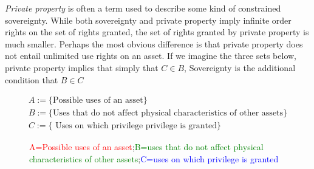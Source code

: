\documentclass[12pt]{article}
\def\firstcircle{(0,0) circle (4cm)}
\def\secondcircle{(60:2cm) circle (2cm)}
\def\thirdcircle{(30:2cm) circle (.9cm)}
\numberwithin{equation}{section}
\begin{document}
\textit{Private property} is often a term used to describe some kind of constrained sovereignty. While both sovereignty and private property imply infinite order rights on the set of rights granted, the set of rights granted by private property is much smaller. Perhaps the most obvious difference is that private property does not entail unlimited use rights on an asset. If we imagine the three sets below, private property implies that simply that $C\in B$, Sovereignty is the additional condition that $B \in C$


\begin{align*}
A:=\{ \text{Possible uses of an asset} \} \\
B:=\{\text{Uses that do not affect physical characteristics of other assets} \} \\
C:=\{\text{ Uses on which privilege privilege is granted}\}
\end{align*}


\begin{figure}
\begin{center}
\caption{ \textcolor{red}{A=Possible uses of an asset};\textcolor{green}{B=uses that do not affect physical characteristics of other assets};\textcolor{blue}{C=uses on which privilege is granted} }
\end{center}
\end{figure}
\end{document}
